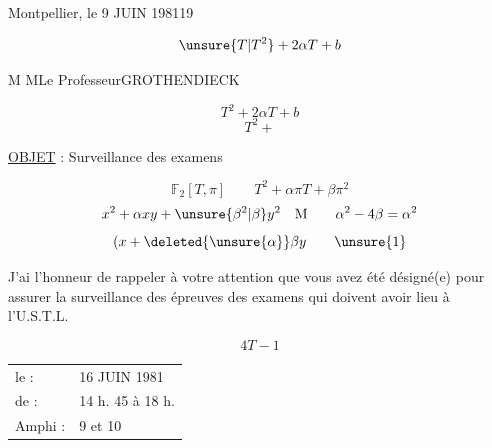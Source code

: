 Montpellier, le  9 JUIN 1981\hfill 19

\[
\unsure{T|T^2}+2\alpha T+b
\]

M M\quad Le Professeur\quad GROTHENDIECK

\[
T^2+2\alpha T+b
\]
\[
T^2+
\]

\uline{OBJET} : Surveillance des examens

\[
\mathbb F_2[T,\pi]\qquad T^2+\alpha\pi T+\beta\pi^2
\]
\[
x^2+\alpha xy+\unsure{\beta^2|\beta}y^2\quad\text{M}
\qquad
\alpha^2-4\beta=\alpha^2
\]
\[
(x+\deleted{\unsure{\alpha}}\beta y
\qquad\unsure{1}
\]

J'ai l'honneur de rappeler à votre attention que vous
avez été désigné(e) pour assurer la surveillance des épreuves des examens
qui doivent avoir lieu à l'U.S.T.L.

\[
4T-1
\]

\begin{tabular}{ll}
le : & 16 JUIN 1981\\
de : & 14 h. 45 à 18 h.\\
Amphi : & 9 et 10
\end{tabular}

\noindent{}

